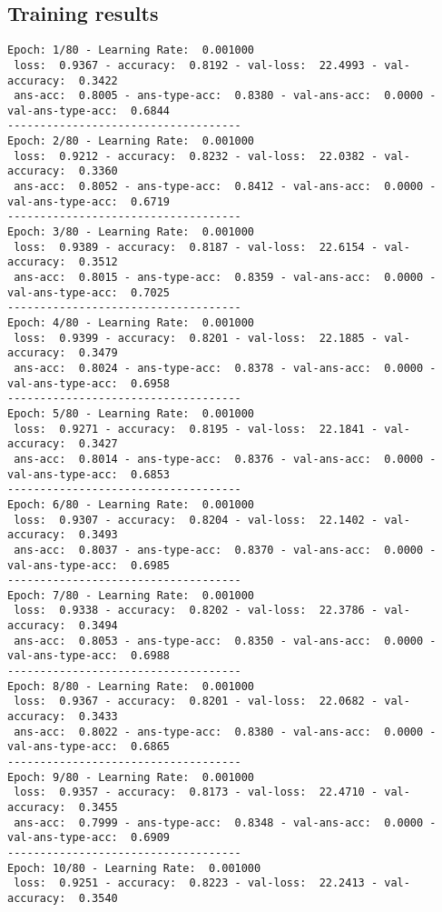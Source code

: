 \documentclass{report}
\begin{document}
\subsection{Training results}
\begin{verbatim}
Epoch: 1/80 - Learning Rate:  0.001000
 loss:  0.9367 - accuracy:  0.8192 - val-loss:  22.4993 - val-accuracy:  0.3422
 ans-acc:  0.8005 - ans-type-acc:  0.8380 - val-ans-acc:  0.0000 - val-ans-type-acc:  0.6844
------------------------------------
Epoch: 2/80 - Learning Rate:  0.001000
 loss:  0.9212 - accuracy:  0.8232 - val-loss:  22.0382 - val-accuracy:  0.3360
 ans-acc:  0.8052 - ans-type-acc:  0.8412 - val-ans-acc:  0.0000 - val-ans-type-acc:  0.6719
------------------------------------
Epoch: 3/80 - Learning Rate:  0.001000
 loss:  0.9389 - accuracy:  0.8187 - val-loss:  22.6154 - val-accuracy:  0.3512
 ans-acc:  0.8015 - ans-type-acc:  0.8359 - val-ans-acc:  0.0000 - val-ans-type-acc:  0.7025
------------------------------------
Epoch: 4/80 - Learning Rate:  0.001000
 loss:  0.9399 - accuracy:  0.8201 - val-loss:  22.1885 - val-accuracy:  0.3479
 ans-acc:  0.8024 - ans-type-acc:  0.8378 - val-ans-acc:  0.0000 - val-ans-type-acc:  0.6958
------------------------------------
Epoch: 5/80 - Learning Rate:  0.001000
 loss:  0.9271 - accuracy:  0.8195 - val-loss:  22.1841 - val-accuracy:  0.3427
 ans-acc:  0.8014 - ans-type-acc:  0.8376 - val-ans-acc:  0.0000 - val-ans-type-acc:  0.6853
------------------------------------
Epoch: 6/80 - Learning Rate:  0.001000
 loss:  0.9307 - accuracy:  0.8204 - val-loss:  22.1402 - val-accuracy:  0.3493
 ans-acc:  0.8037 - ans-type-acc:  0.8370 - val-ans-acc:  0.0000 - val-ans-type-acc:  0.6985
------------------------------------
Epoch: 7/80 - Learning Rate:  0.001000
 loss:  0.9338 - accuracy:  0.8202 - val-loss:  22.3786 - val-accuracy:  0.3494
 ans-acc:  0.8053 - ans-type-acc:  0.8350 - val-ans-acc:  0.0000 - val-ans-type-acc:  0.6988
------------------------------------
Epoch: 8/80 - Learning Rate:  0.001000
 loss:  0.9367 - accuracy:  0.8201 - val-loss:  22.0682 - val-accuracy:  0.3433
 ans-acc:  0.8022 - ans-type-acc:  0.8380 - val-ans-acc:  0.0000 - val-ans-type-acc:  0.6865
------------------------------------
Epoch: 9/80 - Learning Rate:  0.001000
 loss:  0.9357 - accuracy:  0.8173 - val-loss:  22.4710 - val-accuracy:  0.3455
 ans-acc:  0.7999 - ans-type-acc:  0.8348 - val-ans-acc:  0.0000 - val-ans-type-acc:  0.6909
------------------------------------
Epoch: 10/80 - Learning Rate:  0.001000
 loss:  0.9251 - accuracy:  0.8223 - val-loss:  22.2413 - val-accuracy:  0.3540

\end{verbatim}
\end{document}
